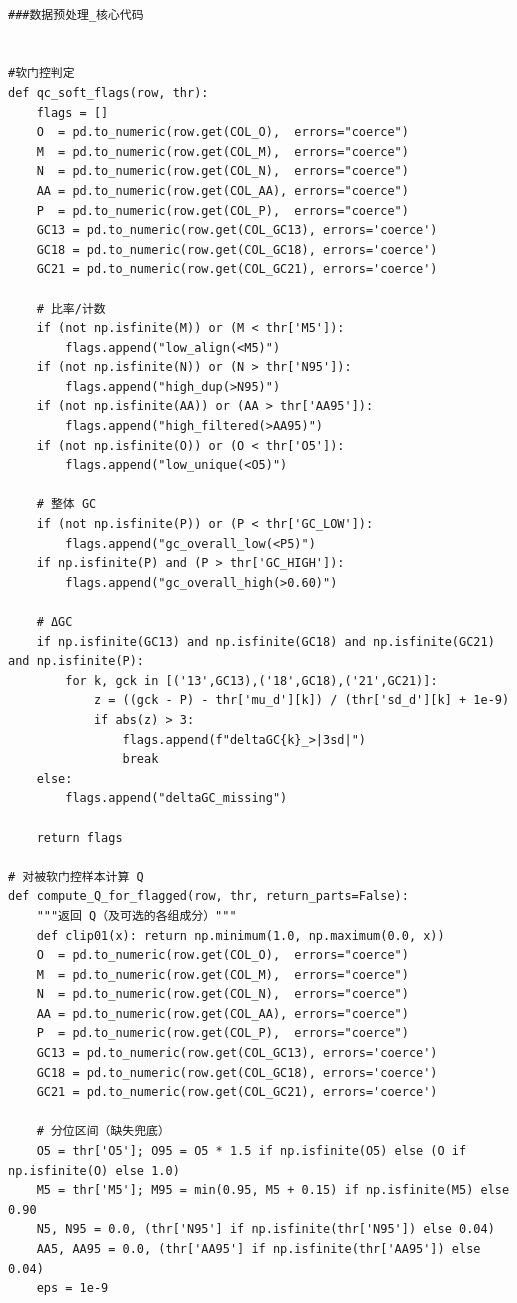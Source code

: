 \begin{lstlisting}

###数据预处理_核心代码


#软门控判定
def qc_soft_flags(row, thr):
    flags = []
    O  = pd.to_numeric(row.get(COL_O),  errors="coerce")
    M  = pd.to_numeric(row.get(COL_M),  errors="coerce")
    N  = pd.to_numeric(row.get(COL_N),  errors="coerce")
    AA = pd.to_numeric(row.get(COL_AA), errors="coerce")
    P  = pd.to_numeric(row.get(COL_P),  errors="coerce")
    GC13 = pd.to_numeric(row.get(COL_GC13), errors='coerce')
    GC18 = pd.to_numeric(row.get(COL_GC18), errors='coerce')
    GC21 = pd.to_numeric(row.get(COL_GC21), errors='coerce')

    # 比率/计数
    if (not np.isfinite(M)) or (M < thr['M5']):
        flags.append("low_align(<M5)")
    if (not np.isfinite(N)) or (N > thr['N95']):
        flags.append("high_dup(>N95)")
    if (not np.isfinite(AA)) or (AA > thr['AA95']):
        flags.append("high_filtered(>AA95)")
    if (not np.isfinite(O)) or (O < thr['O5']):
        flags.append("low_unique(<O5)")

    # 整体 GC
    if (not np.isfinite(P)) or (P < thr['GC_LOW']):
        flags.append("gc_overall_low(<P5)")
    if np.isfinite(P) and (P > thr['GC_HIGH']):
        flags.append("gc_overall_high(>0.60)")

    # ΔGC
    if np.isfinite(GC13) and np.isfinite(GC18) and np.isfinite(GC21) and np.isfinite(P):
        for k, gck in [('13',GC13),('18',GC18),('21',GC21)]:
            z = ((gck - P) - thr['mu_d'][k]) / (thr['sd_d'][k] + 1e-9)
            if abs(z) > 3:
                flags.append(f"deltaGC{k}_>|3sd|")
                break
    else:
        flags.append("deltaGC_missing")

    return flags

# 对被软门控样本计算 Q 
def compute_Q_for_flagged(row, thr, return_parts=False):
    """返回 Q（及可选的各组成分）"""
    def clip01(x): return np.minimum(1.0, np.maximum(0.0, x))
    O  = pd.to_numeric(row.get(COL_O),  errors="coerce")
    M  = pd.to_numeric(row.get(COL_M),  errors="coerce")
    N  = pd.to_numeric(row.get(COL_N),  errors="coerce")
    AA = pd.to_numeric(row.get(COL_AA), errors="coerce")
    P  = pd.to_numeric(row.get(COL_P),  errors="coerce")
    GC13 = pd.to_numeric(row.get(COL_GC13), errors='coerce')
    GC18 = pd.to_numeric(row.get(COL_GC18), errors='coerce')
    GC21 = pd.to_numeric(row.get(COL_GC21), errors='coerce')

    # 分位区间（缺失兜底）
    O5 = thr['O5']; O95 = O5 * 1.5 if np.isfinite(O5) else (O if np.isfinite(O) else 1.0)
    M5 = thr['M5']; M95 = min(0.95, M5 + 0.15) if np.isfinite(M5) else 0.90
    N5, N95 = 0.0, (thr['N95'] if np.isfinite(thr['N95']) else 0.04)
    AA5, AA95 = 0.0, (thr['AA95'] if np.isfinite(thr['AA95']) else 0.04)
    eps = 1e-9


\end{lstlisting}
